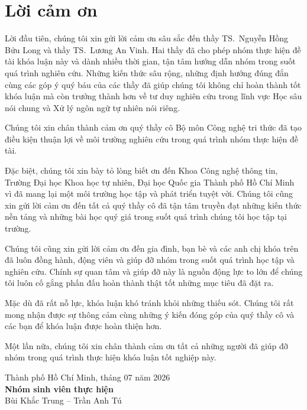 \chapter*{Lời cảm ơn}
\label{thanks}

Lời đầu tiên, chúng tôi xin gửi lời cảm ơn sâu sắc đến thầy TS.~Nguyễn Hồng Bửu Long
và thầy TS.~Lương An Vinh. Hai thầy đã cho phép nhóm thực hiện đề tài khóa luận này
và dành nhiều thời gian, tận tâm hướng dẫn nhóm trong suốt quá trình nghiên cứu.
Những kiến thức sâu rộng, những định hướng đúng đắn cùng các góp ý quý báu của các
thầy đã giúp chúng tôi không chỉ hoàn thành tốt khóa luận mà còn trưởng thành hơn
về tư duy nghiên cứu trong lĩnh vực Học sâu nói chung và Xử lý ngôn ngữ tự nhiên
nói riêng.

Chúng tôi xin chân thành cảm ơn quý thầy cô Bộ môn Công nghệ tri thức đã tạo điều
kiện thuận lợi về môi trường nghiên cứu trong quá trình nhóm thực hiện đề tài.

Đặc biệt, chúng tôi xin bày tỏ lòng biết ơn đến Khoa Công nghệ thông tin, Trường
Đại học Khoa học tự nhiên, Đại học Quốc gia Thành phố Hồ Chí Minh vì đã mang lại
một môi trường học tập và phát triển tuyệt vời. Chúng tôi cũng xin gửi lời cảm ơn
đến tất cả quý thầy cô đã tận tâm truyền đạt những kiến thức nền tảng và những bài
học quý giá trong suốt quá trình chúng tôi học tập tại trường.

Chúng tôi cũng xin gửi lời cảm ơn đến gia đình, bạn bè và các anh chị khóa trên đã
luôn đồng hành, động viên và giúp đỡ nhóm trong suốt quá trình học tập và nghiên
cứu. Chính sự quan tâm và giúp đỡ này là nguồn động lực to lớn để chúng tôi luôn
cố gắng phấn đấu hoàn thành thật tốt những mục tiêu đã đặt ra.

Mặc dù đã rất nỗ lực, khóa luận khó tránh khỏi những thiếu sót. Chúng tôi rất mong
nhận được sự thông cảm cùng những ý kiến đóng góp của quý thầy cô và các bạn để
khóa luận được hoàn thiện hơn.

Một lần nữa, chúng tôi xin chân thành cảm ơn tất cả những người đã giúp đỡ nhóm
trong quá trình thực hiện khóa luận tốt nghiệp này.

\begin{flushright}
\begin{minipage}{0.62\textwidth}
\centering
Thành phố Hồ Chí Minh, tháng 07 năm 2026\\[2mm]
\textbf{Nhóm sinh viên thực hiện}\\[2.5cm]
Bùi Khắc Trung -- Trần Anh Tú
\end{minipage}
\end{flushright}
